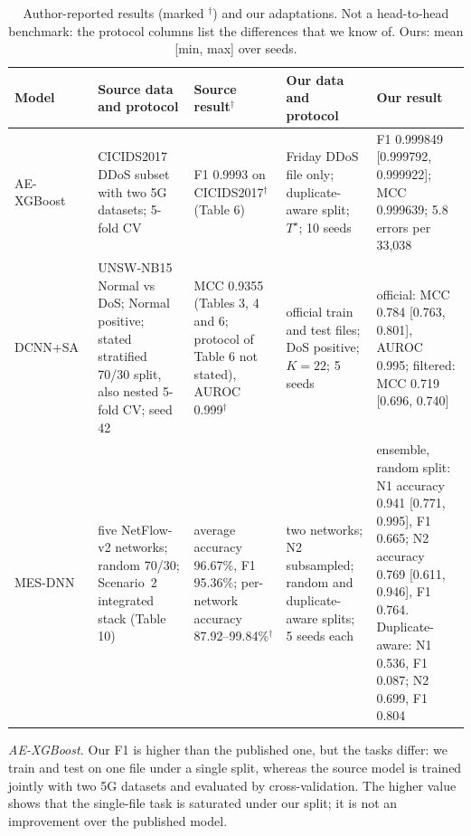\documentclass[journal]{IEEEtran}
\newcommand{\Tstar}{T^{\star}}
\begin{document}
\begin{table}[!t]
\centering
\caption{\upshape Author-reported results (marked $^{\dagger}$) and our adaptations. Not a head-to-head
benchmark: the protocol columns list the differences that we know of. Ours: mean [min, max] over
seeds.}
\label{tab:compare}
\footnotesize\renewcommand{\arraystretch}{1.18}
\begin{tabular}{@{}L{2.1cm}L{3.1cm}L{3.2cm}L{3.3cm}L{4.6cm}@{}}
\toprule
Model & Source data and protocol & Source result$^{\dagger}$ & Our data and protocol & Our result \\
\midrule
AE-XGBoost~\cite{nezhadsistani2026} & CICIDS2017 DDoS subset with two 5G datasets; 5-fold CV & F1 0.9993 on CICIDS2017$^{\dagger}$ (Table 6) & Friday DDoS file only; duplicate-aware split; $\Tstar$; 10 seeds & F1 0.999849 [0.999792, 0.999922]; MCC 0.999639; 5.8 errors per 33,038 \\
DCNN+SA~\cite{fang2026} & UNSW-NB15 Normal vs DoS; Normal positive; stated stratified 70/30 split, also nested 5-fold CV; seed 42 & MCC 0.9355 (Tables 3, 4 and 6; protocol of Table 6 not stated), AUROC 0.999$^{\dagger}$ & official train and test files; DoS positive; $K=22$; 5 seeds & official: MCC 0.784 [0.763, 0.801], AUROC 0.995; filtered: MCC 0.719 [0.696, 0.740] \\
MES-DNN~\cite{wardana2026} & five NetFlow-v2 networks; random 70/30; Scenario~2 integrated stack (Table 10) & average accuracy 96.67\%, F1 95.36\%; per-network accuracy 87.92--99.84\%$^{\dagger}$ & two networks; N2 subsampled; random and duplicate-aware splits; 5 seeds each & ensemble, random split: N1 accuracy 0.941 [0.771, 0.995], F1 0.665; N2 accuracy 0.769 [0.611, 0.946], F1 0.764. Duplicate-aware: N1 0.536, F1 0.087; N2 0.699, F1 0.804 \\
\bottomrule
\end{tabular}
\end{table}

\textit{AE-XGBoost.} Our F1 is higher than the published one, but the tasks differ: we train and
test on one file under a single split, whereas the source model is trained jointly with two 5G
datasets and evaluated by cross-validation. The higher value shows that the single-file task is
saturated under our split; it is not an improvement over the published model.
\end{document}
